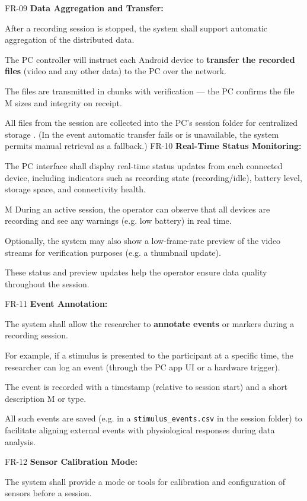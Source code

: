 FR-09 \textbf{Data Aggregation and Transfer:}

After a recording session is stopped, the system shall support automatic
aggregation of the distributed data.

The PC controller will instruct each Android device to \textbf{transfer the recorded files}
 (video and any other data) to the PC over the network.

The files are transmitted in chunks with verification --- the PC confirms the
file M sizes and integrity on receipt.

All files from the session are collected into the PC's session folder for centralized storage
.
(In the event automatic transfer fails or is unavailable, the system permits manual retrieval as a fallback.) FR-10 \textbf{Real-Time Status Monitoring:}

The PC interface shall display real-time status updates from each connected
device, including indicators such as recording state (recording/idle), battery
level, storage space, and connectivity health.

M During an active session, the operator can observe that all devices are
recording and see any warnings (e.g. low battery) in real time.

Optionally, the system may also show a low-frame-rate preview of the video
streams for verification purposes (e.g. a thumbnail update).

These status and preview updates help the operator ensure data quality
throughout the session.

FR-11 \textbf{Event Annotation:}

The system shall allow the researcher to \textbf{annotate events}
 or markers during a recording session.

For example, if a stimulus is presented to the participant at a specific time,
the researcher can log an event (through the PC app UI or a hardware trigger).

The event is recorded with a timestamp (relative to session start) and a short
description M or type.

All such events are saved (e.g. in a \texttt{stimulus\_events.csv} in the
session folder) to facilitate aligning external events with physiological
responses during data analysis.

FR-12 \textbf{Sensor Calibration Mode:}

The system shall provide a mode or tools for calibration and configuration of
sensors before a session.

